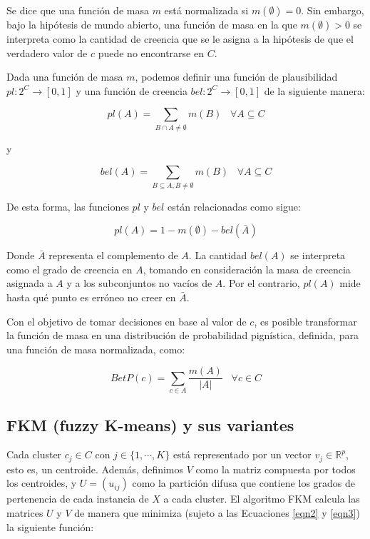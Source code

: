 Se dice que una función de masa $m$ está normalizada si $m(\emptyset) = 0$. Sin embargo, bajo la hipótesis de mundo abierto, una función de masa en la que $m(\emptyset) > 0$ se interpreta como la cantidad de creencia que se le asigna a la hipótesis de que el verdadero valor de $c$ puede no encontrarse en $C$.

Dada una función de masa $m$, podemos definir una función de plausibilidad $pl:2^C \rightarrow [0,1]$ y una función de creencia $bel: 2^C \rightarrow [0,1]$ de la siguiente manera:

\begin{equation}
pl(A) = \sum_{B \cap A \neq \emptyset} m(B) \;\;\; \forall A \subseteq C
\label{eqn4}
\end{equation}

y 

\begin{equation}
bel(A) = \sum_{B \subseteq A, B \neq \emptyset} m(B) \;\;\; \forall A \subseteq C
\label{eqn5}
\end{equation}

De esta forma, las funciones $pl$ y $bel$ están relacionadas como sigue:

\begin{equation}
pl(A) = 1 - m(\emptyset) - bel(\bar{A})
\label{eqn6}
\end{equation}

Donde $\bar{A}$ representa el complemento de $A$.  La cantidad $bel(A)$ se interpreta como el grado de creencia en $A$, tomando en consideración la masa de creencia asignada a $A$ y a los subconjuntos no vacíos de $A$. Por el contrario, $pl(A)$ mide hasta qué punto es erróneo no creer en $\bar{A}$.

Con el objetivo de tomar decisiones en base al valor de $c$, es posible transformar la función de masa en una distribución de probabilidad pignística, definida, para una función de masa normalizada, como:

\begin{equation}
BetP(c) = \sum_{c \in A} \frac{m(A)}{|A|} \;\;\; \forall c \in C
\label{eqn7}
\end{equation}

\subsection{FKM (fuzzy K-means) y sus variantes}

Cada cluster $c_j \in C$ con $j \in \{1,\cdots,K\}$ está representado por un vector $v_j \in \mathbb{R}^p$, esto es, un centroide. Además, definimos $V$ como la matriz compuesta por todos los centroides, y $U = (u_{ij})$ como la partición difusa que contiene los grados de pertenencia de cada instancia de $X$ a cada cluster. El algoritmo \acf{FKM} calcula las matrices $U$ y $V$ de manera que minimiza (sujeto a las Ecuaciones \ref{eqn2} y \ref{eqn3}) la siguiente función:


